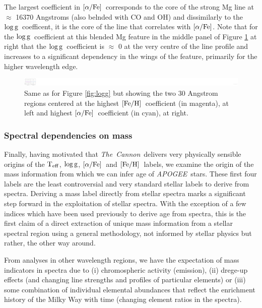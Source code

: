 \documentclass[12pt, preprint]{aastex}
\newcommand{\project}[1]{\textsl{#1}}
\newcommand{\tc}{\project{The~Cannon}}
\newcommand{\apogee}{\project{APOGEE}}
\newcommand{\teff}{\mbox{$\rm T_{eff}$}}
\newcommand{\feh}{\mbox{$\rm [Fe/H]$}}
\newcommand{\alphafe}{\mbox{$\rm [\alpha/Fe]$}}
\newcommand{\logg}{\mbox{$\rm \log g$}}
\begin{document}
The largest coefficient in \alphafe\ corresponds to the core of the strong Mg line at $\approx$ 16370 Angstroms (also belnded with CO and OH) and dissimilarly to the \logg\ coefficent, it is the core of the line that correlates with \alphafe. Note that for the \logg\ coefficient at this blended Mg feature in the middle panel of Figure \ref{fig:feha} at right that the \logg\ coefficient is $\approx$ 0 at the very centre of the line profile and increases to a significant dependency in the wings of the feature, primarily for the higher wavelength edge. 


\begin{figure}[h!]
\centering
    \includegraphics[scale=0.51]{./plots/coeffs_af_3.png}
  \caption{Same as for Figure \ref{fig:logg} but showing the two 30 Angstrom regions centered at the highest \feh\ coefficient (in magenta), at left and highest \alphafe\ coefficient (in cyan), at right.}
\label{fig:feha}
\end{figure}



\subsubsection{Spectral dependencies on mass} 

Finally, having motivated that \tc\ delivers very physically sensible origins of the \teff, \logg, \alphafe\ and \feh\ labels, we examine the origin of the mass information from which we can infer age of \apogee\ stars. 
These first four labels are the least controversial and very standard stellar labels to derive from spectra. Deriving a mass label directly from stellar spectra marks a significant step forward in the exploitation of stellar spectra. With the exception of a few indices which have been used previously to derive age from spectra, this is the first claim of a direct extraction of unique mass information from a stellar spectral region using a general methodology, not informed by stellar physics but rather, the other way around. 

From analyses in other wavelength regions, we have the expectation of mass indicators in spectra due to (i) chromospheric activity (emission), (ii) drege-up effects (and changing line strengths and profiles of particular elements) or (iii) some combination of individual elemental abundances that reflect the enrichment history of the Milky Way with time (changing element ratios in the spectra). 
\end{document}
